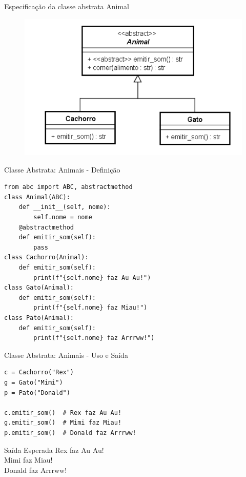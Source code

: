 \begin{frame}{Especificação da classe abstrata Animal}
    \begin{figure}
        \centering
        \includegraphics[width=0.5\linewidth]{Images/classe-abstrata-animal.png}

        \label{fig:placeholder}
    \end{figure}
\end{frame}

\begin{frame}[fragile]{Classe Abstrata: Animais - Definição}
    \small
    \begin{verbatim}
from abc import ABC, abstractmethod
class Animal(ABC):
    def __init__(self, nome):
        self.nome = nome
    @abstractmethod
    def emitir_som(self):
        pass
class Cachorro(Animal):
    def emitir_som(self):
        print(f"{self.nome} faz Au Au!")
class Gato(Animal):
    def emitir_som(self):
        print(f"{self.nome} faz Miau!")
class Pato(Animal):
    def emitir_som(self):
        print(f"{self.nome} faz Arrrww!")
\end{verbatim}

\end{frame}

\begin{frame}[fragile]{Classe Abstrata: Animais - Uso e Saída}

    \begin{verbatim}
c = Cachorro("Rex")
g = Gato("Mimi")
p = Pato("Donald")

c.emitir_som()  # Rex faz Au Au!
g.emitir_som()  # Mimi faz Miau!
p.emitir_som()  # Donald faz Arrrww!
\end{verbatim}

    \begin{block}{Saída Esperada}
        Rex faz Au Au! \\
        Mimi faz Miau! \\
        Donald faz Arrrww!
    \end{block}

\end{frame}
